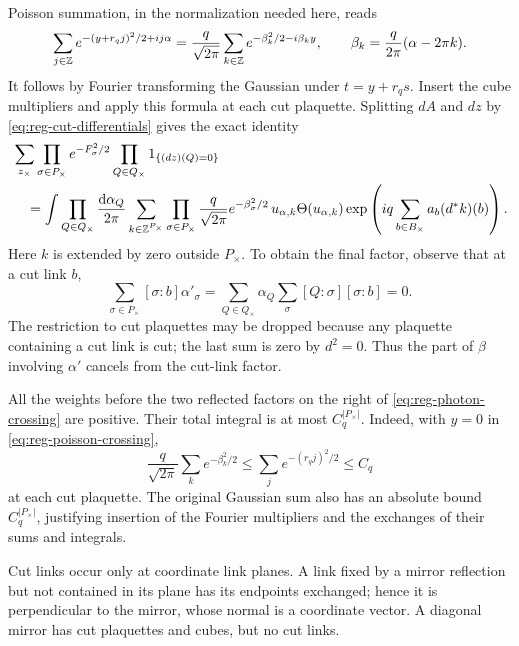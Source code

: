 Poisson summation, in the normalization needed here, reads
\begin{equation}\label{eq:reg-poisson-crossing}
 \sum_{j\in\mathbb Z}e^{-(y+r_qj)^2/2+ij\alpha}
 =\frac{q}{\sqrt{2\pi}}\sum_{k\in\mathbb Z}
          e^{-\beta_k^2/2-i\beta_ky},
 \qquad\beta_k=\frac{q}{2\pi}(\alpha-2\pi k).
\end{equation}
It follows by Fourier transforming the Gaussian under
$t=y+r_qs$. Insert the cube multipliers and apply this formula at
each cut plaquette. Splitting $dA$ and $dz$ by
\eqref{eq:reg-cut-differentials} gives the exact identity
\begin{align}\label{eq:reg-photon-crossing}
 &\sum_{z_\times}
       \prod_{\sigma\in P_\times}e^{-F_\sigma^2/2}
       \prod_{Q\in Q_\times}1_{\{(dz)(Q)=0\}}
 \nonumber\\
 &\quad=\int\prod_{Q\in Q_\times}\frac{\mathrm d\alpha_Q}{2\pi}
       \sum_{k\in\mathbb Z^{P_\times}}
       \prod_{\sigma\in P_\times}
               \frac{q}{\sqrt{2\pi}}e^{-\beta_\sigma^2/2}\,
       u_{\alpha,k}\Theta(u_{\alpha,k})
       \exp\left(iq\sum_{b\in B_\times}a_b(d^*k)(b)\right).
\end{align}
Here $k$ is extended by zero outside $P_\times$. To obtain the final
factor, observe that at a cut link $b$,
\[
 \sum_{\sigma\in P_\times}[\sigma:b]\alpha'_\sigma
 =\sum_{Q\in Q_\times}\alpha_Q
                    \sum_\sigma[Q:\sigma][\sigma:b]=0.
\]
The restriction to cut plaquettes may be dropped because any
plaquette containing a cut link is cut; the last sum is zero by
$d^2=0$. Thus the part of $\beta$ involving $\alpha'$ cancels from
the cut-link factor.

All the weights before the two reflected factors on the right of
\eqref{eq:reg-photon-crossing} are positive. Their total integral is
at most $C_q^{|P_\times|}$. Indeed, with $y=0$ in
\eqref{eq:reg-poisson-crossing},
\[
 \frac{q}{\sqrt{2\pi}}\sum_k e^{-\beta_k^2/2}
 \le\sum_j e^{-(r_qj)^2/2}\le C_q
\]
at each cut plaquette. The original Gaussian sum also has an
absolute bound $C_q^{|P_\times|}$, justifying insertion of the
Fourier multipliers and the exchanges of their sums and integrals.

Cut links occur only at coordinate link planes. A link fixed by a
mirror reflection but not contained in its plane has its endpoints
exchanged; hence it is perpendicular to the mirror, whose normal
is a coordinate vector. A diagonal mirror has cut plaquettes and
cubes, but no cut links.


